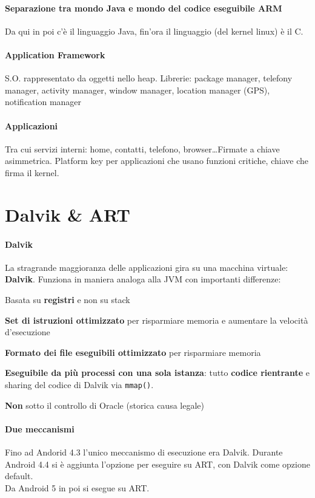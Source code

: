 \documentclass[10pt]{book}
\begin{document}
\paragraph{Separazione tra mondo Java e mondo del codice eseguibile ARM} Da qui in poi c'è il linguaggio Java, fin'ora il linguaggio (del kernel linux) è il C.
\paragraph{Application Framework} S.O. rappresentato da oggetti nello heap. Librerie: package manager, telefony manager, activity manager, window manager, location manager (GPS), notification manager
\paragraph{Applicazioni} Tra cui servizi interni: home, contatti, telefono, browser\ldots Firmate a chiave asimmetrica. Platform key per applicazioni che usano funzioni critiche, chiave che firma il kernel.
\section{Dalvik \& ART}
\paragraph{Dalvik} La stragrande maggioranza delle applicazioni gira su una macchina virtuale: \textbf{Dalvik}. Funziona in maniera analoga alla JVM con importanti differenze:
\begin{list}{}{}
	\item Basata su \textbf{registri} e non su stack
	\item \textbf{Set di istruzioni ottimizzato} per risparmiare memoria e aumentare la velocità d'esecuzione
	\item \textbf{Formato dei file eseguibili ottimizzato} per risparmiare memoria
	\item \textbf{Eseguibile da più processi con una sola istanza}: tutto \textbf{codice rientrante} e sharing del codice di Dalvik via \texttt{mmap()}.
	\item \textbf{Non} sotto il controllo di Oracle (storica causa legale)
\end{list}
\paragraph{Due meccanismi} Fino ad Andorid 4.3 l'unico meccanismo di esecuzione era Dalvik. Durante Android 4.4 si è aggiunta l'opzione per eseguire su ART, con Dalvik come opzione default.\\
Da Android 5 in poi si esegue su ART.
\end{document}
